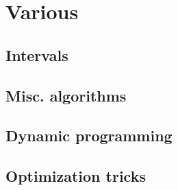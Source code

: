 \chapter{Various}

\section{Intervals}

\section{Misc. algorithms}

\section{Dynamic programming}


\section{Optimization tricks}
